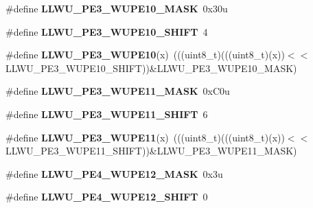 \begin{DoxyCompactItemize}
\item 
\#define {\bfseries L\+L\+W\+U\+\_\+\+P\+E3\+\_\+\+W\+U\+P\+E10\+\_\+\+M\+A\+SK}~0x30u\hypertarget{group__LLWU__Register__Masks_ga6d8e812233df26a72459712117996efa}{}\label{group__LLWU__Register__Masks_ga6d8e812233df26a72459712117996efa}

\item 
\#define {\bfseries L\+L\+W\+U\+\_\+\+P\+E3\+\_\+\+W\+U\+P\+E10\+\_\+\+S\+H\+I\+FT}~4\hypertarget{group__LLWU__Register__Masks_ga1686c8515045158eeef3fc0c5df480d9}{}\label{group__LLWU__Register__Masks_ga1686c8515045158eeef3fc0c5df480d9}

\item 
\#define {\bfseries L\+L\+W\+U\+\_\+\+P\+E3\+\_\+\+W\+U\+P\+E10}(x)~(((uint8\+\_\+t)(((uint8\+\_\+t)(x))$<$$<$L\+L\+W\+U\+\_\+\+P\+E3\+\_\+\+W\+U\+P\+E10\+\_\+\+S\+H\+I\+FT))\&L\+L\+W\+U\+\_\+\+P\+E3\+\_\+\+W\+U\+P\+E10\+\_\+\+M\+A\+SK)\hypertarget{group__LLWU__Register__Masks_ga5ba778d142ba95753b9eec4e9c5e73f6}{}\label{group__LLWU__Register__Masks_ga5ba778d142ba95753b9eec4e9c5e73f6}

\item 
\#define {\bfseries L\+L\+W\+U\+\_\+\+P\+E3\+\_\+\+W\+U\+P\+E11\+\_\+\+M\+A\+SK}~0x\+C0u\hypertarget{group__LLWU__Register__Masks_gad46cfb926e4e6bbc0cba079fb07a2bfd}{}\label{group__LLWU__Register__Masks_gad46cfb926e4e6bbc0cba079fb07a2bfd}

\item 
\#define {\bfseries L\+L\+W\+U\+\_\+\+P\+E3\+\_\+\+W\+U\+P\+E11\+\_\+\+S\+H\+I\+FT}~6\hypertarget{group__LLWU__Register__Masks_gad8a60b9eab4fe9a0c559bae94033ca1e}{}\label{group__LLWU__Register__Masks_gad8a60b9eab4fe9a0c559bae94033ca1e}

\item 
\#define {\bfseries L\+L\+W\+U\+\_\+\+P\+E3\+\_\+\+W\+U\+P\+E11}(x)~(((uint8\+\_\+t)(((uint8\+\_\+t)(x))$<$$<$L\+L\+W\+U\+\_\+\+P\+E3\+\_\+\+W\+U\+P\+E11\+\_\+\+S\+H\+I\+FT))\&L\+L\+W\+U\+\_\+\+P\+E3\+\_\+\+W\+U\+P\+E11\+\_\+\+M\+A\+SK)\hypertarget{group__LLWU__Register__Masks_ga73485bbb713aeb9b283996279ffdea6c}{}\label{group__LLWU__Register__Masks_ga73485bbb713aeb9b283996279ffdea6c}

\item 
\#define {\bfseries L\+L\+W\+U\+\_\+\+P\+E4\+\_\+\+W\+U\+P\+E12\+\_\+\+M\+A\+SK}~0x3u\hypertarget{group__LLWU__Register__Masks_ga0d1b6351b58cc9fbf3099dc653754205}{}\label{group__LLWU__Register__Masks_ga0d1b6351b58cc9fbf3099dc653754205}

\item 
\#define {\bfseries L\+L\+W\+U\+\_\+\+P\+E4\+\_\+\+W\+U\+P\+E12\+\_\+\+S\+H\+I\+FT}~0\hypertarget{group__LLWU__Register__Masks_gaddb0a17347a85705dc2c2975129a7942}{}\label{group__LLWU__Register__Masks_gaddb0a17347a85705dc2c2975129a7942}


\end{DoxyCompactItemize}
